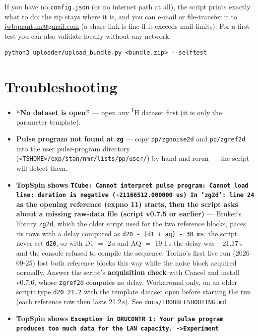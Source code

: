 \documentclass[11pt]{article}
\newcommand{\hnmr}{\textsuperscript{1}H}
\newcommand{\ts}{TopSpin}
\newcommand{\file}[1]{\texttt{#1}}
\newcommand{\dialog}[1]{\textbf{#1}}
\begin{document}
If you have no \file{config.json} (or no internet path at all), the script
prints exactly what to do: the zip stays where it is, and you can e-mail or
file-transfer it to
\href{mailto:jwbquantum@gmail.com}{jwbquantum@gmail.com} (a share link is
fine if it exceeds mail limits). For a first test you can also validate
locally without any network:
\begin{lstlisting}
python3 uploader/upload_bundle.py <bundle.zip> --selftest
\end{lstlisting}

\section{Troubleshooting}
\label{sec:trouble}

\begin{itemize}
\item \textbf{``No dataset is open''} --- open any \hnmr{} dataset first (it
      is only the parameter template).
\item \textbf{Pulse program not found at \texttt{zg}} --- copy
      \file{pp/zgnoise2d} and \file{pp/zgref2d} into the user pulse-program
      directory (\file{<TSHOME>/exp/stan/nmr/lists/pp/user/}) by hand and
      rerun --- the script will detect them.
\item \textbf{\ts{} shows \texttt{TCube: Cannot interpret pulse program:
      Cannot load line: duration is negative (-21166512.000000 us) In
      'zg2d': line 24} as the opening reference (expno 11) starts, then
      the script asks about a missing raw-data file (script v0.7.5 or
      earlier)} --- Bruker's library \file{zg2d}, which the older script
      used for the two reference blocks, paces its rows with a delay
      computed as \texttt{d20 - (d1 + aq) - 30\,ms}; the script never set
      \texttt{d20}, so with D1 $=$ 2\,s and AQ $=$ 19.1\,s the delay was
      $-21.17$\,s and the console refused to compile the sequence. Torino's
      first live run (2026-09-25) lost both reference blocks this way while
      the noise block acquired normally. Answer the script's
      \dialog{acquisition check} with Cancel and install v0.7.6, whose
      \file{zgref2d} computes no delay. Workaround only, on an older
      script: type \texttt{d20 21.2} with the template dataset open before
      starting the run (each reference row then lasts 21.2\,s). See
      \file{docs/TROUBLESHOOTING.md}.
\item \textbf{\ts{} shows \texttt{Exception in DRUCONTR 1: Your pulse
      program produces too much data for the LAN capacity. ->Experiment
}}
\end{itemize}
\end{document}
